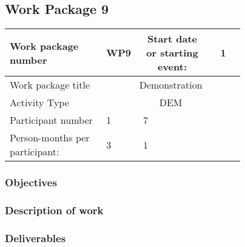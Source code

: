 \subsection{Work Package 9}

\begin{table}[hbpt]\centering
	\begin{tabular}{|p{0.35\linewidth}|p{0.06\linewidth}|p{0.06\linewidth}|p{0.06\linewidth}|
         p{0.06\linewidth}|p{0.06\linewidth}|p{0.06\linewidth}|p{0.06\linewidth}|}\hline
		 Work package number& WP9 &
		 \multicolumn{4}{|c|}{Start date or starting event:}{}&
		 \multicolumn{2}{|c|}{                        1 }{}\\\hline
		 Work package title&\multicolumn{7}{|c|}{ Demonstration }{}\\\hline
		 Activity Type&\multicolumn{7}{|c|}{      DEM }{}\\\hline
		 Participant number & 1 & 7 & ~ & ~ & ~ & ~ & ~ \\\hline
		 Person-months per participant: & 3 & 1 & ~ & ~ & ~ & ~ & ~ \\\hline
	\end{tabular}
\end{table}

\subsubsection{Objectives}

\subsubsection{Description of work}

\subsubsection{Deliverables}